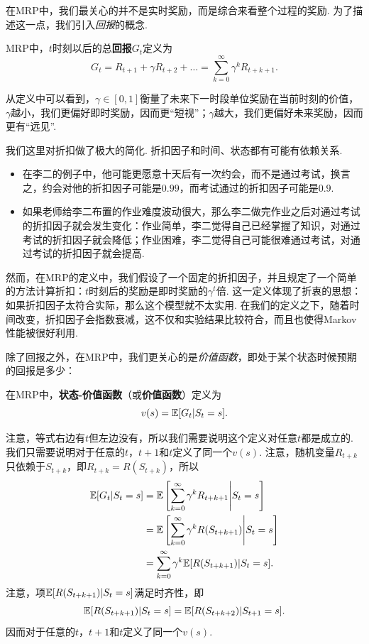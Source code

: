 在MRP中，我们最关心的并不是实时奖励，而是综合来看整个过程的奖励. 为了描述这一点，我们引入\textit{回报}的概念.

\begin{definition}[回报]
MRP中，$t$时刻以后的总\textbf{回报}$G_t$定义为
    \[G_t = R_{t+1}+\gamma R_{t+2} +\dots =\sum_{k=0}^\infty \gamma^kR_{t+k+1}.\]    
\end{definition}
从定义中可以看到，$\gamma \in[0,1]$衡量了未来下一时段单位奖励在当前时刻的价值，$\gamma$越小，我们更偏好即时奖励，因而更“短视”；$\gamma$越大，我们更偏好未来奖励，因而更有“远见”.

我们这里对折扣做了极大的简化. 折扣因子和时间、状态都有可能有依赖关系. 
\begin{itemize}
    \item 在李二的例子中，他可能更愿意十天后有一次约会，而不是通过考试，换言之，约会对他的折扣因子可能是$0.99$，而考试通过的折扣因子可能是$0.9$.
    \item 如果老师给李二布置的作业难度波动很大，那么李二做完作业之后对通过考试的折扣因子就会发生变化：作业简单，李二觉得自己已经掌握了知识，对通过考试的折扣因子就会降低；作业困难，李二觉得自己可能很难通过考试，对通过考试的折扣因子就会提高.
\end{itemize}
然而，在MRP的定义中，我们假设了一个固定的折扣因子，并且规定了一个简单的方法计算折扣：$t$时刻后的奖励是即时奖励的$\gamma^t$倍. 这一定义体现了折衷的思想：如果折扣因子太符合实际，那么这个模型就不太实用. 在我们的定义之下，随着时间改变，折扣因子会指数衰减，这不仅和实验结果比较符合，而且也使得Markov性能被很好利用.

除了回报之外，在MRP中，我们更关心的是\textit{价值函数}，即处于某个状态时候预期的回报是多少：
\begin{definition}[价值函数]
在MRP中，\textbf{状态-价值函数}（或\textbf{价值函数}）定义为
    \[v(s) = \mathbb{E}[G_t|S_t=s].\]
\end{definition}

注意，等式右边有$t$但左边没有，所以我们需要说明这个定义对任意$t$都是成立的. 我们只需要说明对于任意的$t$，$t+1$和$t$定义了同一个$v(s)$. 注意，随机变量$R_{t+k}$只依赖于$S_{t+k}$，即$R_{t+k}=R(S_{t+k})$，所以
\begin{align*}
    \mathbb{E}[G_t|S_t=s] &= \mathbb{E}\left[\sum_{k=0}^\infty \gamma^k R_{t+k+1}\middle|S_t=s\right] \\
    &= \mathbb{E}\left[\sum_{k=0}^\infty \gamma^k R(S_{t+k+1})\middle|S_t=s\right]\\
    &= \sum_{k=0}^\infty \gamma^k \mathbb{E}[R(S_{t+k+1})|S_t=s].
\end{align*}
注意，项$\mathbb{E}[R(S_{t+k+1})|S_t=s]$满足时齐性，即
\[\mathbb{E}[R(S_{t+k+1})|S_t=s]=\mathbb{E}[R(S_{t+k+2})|S_{t+1}=s].\]
因而对于任意的$t$，$t+1$和$t$定义了同一个$v(s)$.

